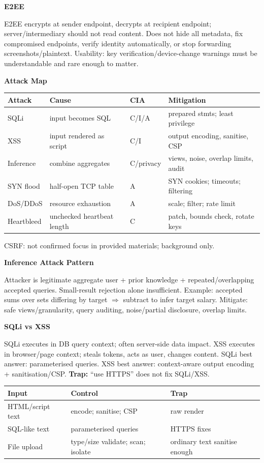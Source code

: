 \documentclass[8pt]{extarticle}
\newcommand{\h}[1]{\vspace{1pt}\textbf{#1}\par}
\newcommand{\trap}{\textbf{Trap:} }
\begin{document}
\begin{multicols*}{5}
\h{E2EE}
E2EE encrypts at sender endpoint, decrypts at recipient endpoint; server/intermediary should not read content. Does not hide all metadata, fix compromised endpoints, verify identity automatically, or stop forwarding screenshots/plaintext. Usability: key verification/device-change warnings must be understandable and rare enough to matter.

\h{Attack Map}
\begin{tabularx}{\linewidth}{@{}lYYY@{}}
\toprule
Attack & Cause & CIA & Mitigation\\ \midrule
SQLi & input becomes SQL & C/I/A & prepared stmts; least privilege\\
XSS & input rendered as script & C/I & output encoding, sanitise, CSP\\
Inference & combine aggregates & C/privacy & views, noise, overlap limits, audit\\
SYN flood & half-open TCP table & A & SYN cookies; timeouts; filtering\\
DoS/DDoS & resource exhaustion & A & scale; filter; rate limit\\
Heartbleed & unchecked heartbeat length & C & patch, bounds check, rotate keys\\
\bottomrule
\end{tabularx}
CSRF: not confirmed focus in provided materials; background only.

\h{Inference Attack Pattern}
Attacker is legitimate aggregate user + prior knowledge + repeated/overlapping accepted queries. Small-result rejection alone insufficient. Example: accepted sums over sets differing by target $\Rightarrow$ subtract to infer target salary. Mitigate: safe views/granularity, query auditing, noise/partial disclosure, overlap limits.

\h{SQLi vs XSS}
SQLi executes in DB query context; often server-side data impact. XSS executes in browser/page context; steals tokens, acts as user, changes content. SQLi best answer: parameterised queries. XSS best answer: context-aware output encoding + sanitisation/CSP. \trap ``use HTTPS'' does not fix SQLi/XSS.
\begin{tabularx}{\linewidth}{@{}lYY@{}}
\toprule
Input & Control & Trap\\ \midrule
HTML/script text & encode; sanitise; CSP & raw render\\
SQL-like text & parameterised queries & HTTPS fixes\\
File upload & type/size validate; scan; isolate & ordinary text sanitise enough\\
\bottomrule
\end{tabularx}


\end{multicols*}
\end{document}
